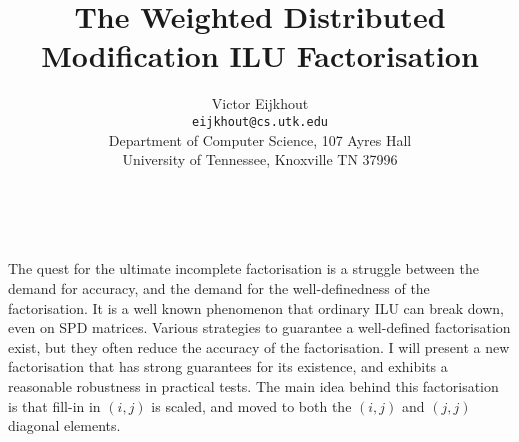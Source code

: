 \documentclass[11pt]{article}
\date{ ~ \hspace{-4mm}}
\title{The Weighted Distributed Modification ILU Factorisation  }
\author{Victor Eijkhout \\ {\tt eijkhout@cs.utk.edu} \\ Department of Computer Science, 107 Ayres Hall \\ University of Tennessee, Knoxville TN 37996}
\begin{document}
\maketitle
\thispagestyle{empty}





 



The quest for the ultimate incomplete factorisation is a struggle
between the demand for accuracy, and the demand for the well-definedness
of the factorisation. It is a well known phenomenon that ordinary
ILU can break down, even on SPD matrices. Various strategies to guarantee
a well-defined factorisation exist, but they often reduce the accuracy
of the factorisation. I will present a new factorisation that has
strong guarantees for its existence, and exhibits a reasonable
robustness in practical tests. The main idea behind this factorisation
is that fill-in in $(i,j)$ is scaled, and moved to both the
$(i,j)$ and $(j,j)$
diagonal elements.
\end{document}
